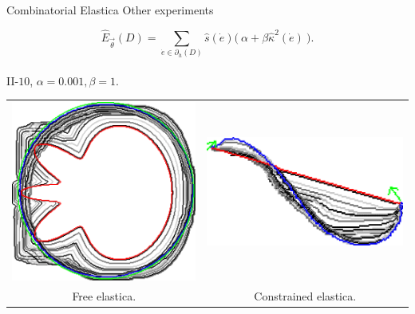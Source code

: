 \begin{frame}
	{Combinatorial Elastica}
	{Other experiments}
\begin{center}
{\footnotesize
\[
\hat{E}_{\vec{\theta}}(D) = \sum_{\dot{e} \in \partial_h(D)}{\hat{s}(\dot{e}) \Big(\: \alpha + \beta \hat{\kappa}^2(\dot{e}) \: \Big). }\]
}\\

II-$10$, $\alpha=0.001, \beta=1.$

\vspace{1em}
	
\begin{tabular}{cc}
\includegraphics[scale=0.25]{figures/combinatorial-elastica/other-experiments/ii/elastica/len_pen_0.001000/jonctions_1/curve_segs_4/best/gs_0.25000/flower.png}&
\includegraphics[scale=0.25]{figures/combinatorial-elastica/other-experiments/ii/elastica/len_pen_0.001000/jonctions_1/curve_segs_4/best/gs_0.25000/curve.png}\\
Free elastica. & Constrained elastica.
\end{tabular}
\end{center}


\end{frame}
